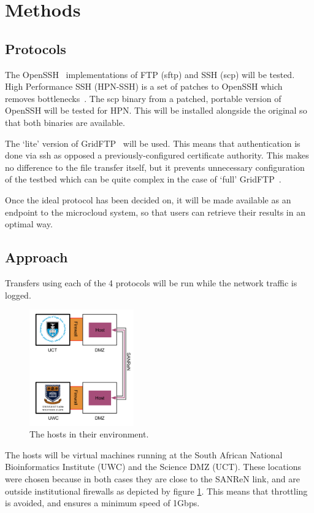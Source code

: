 \documentclass{sig-alternate-05-2015}
\begin{document}
\section{Methods}
\subsection{Protocols}
The OpenSSH~\cite{openssh} implementations of FTP (sftp) and SSH (scp) will be tested. High Performance SSH (HPN-SSH) is a set of patches to OpenSSH which removes bottlenecks~\cite{rapier2008high}. The scp binary from a patched, portable version of OpenSSH will be tested for HPN. This will be installed alongside the original so that both binaries are available.

The `lite' version of GridFTP~\cite{allcock2005globus} will be used. This means that authentication is done via ssh as opposed a previously-configured certificate authority. This makes no difference to the file transfer itself, but it prevents unnecessary configuration of the testbed which can be quite complex in the case of `full' GridFTP~\cite{gridftplite}.

Once the ideal protocol has been decided on, it will be made available as an endpoint to the microcloud system, so that users can retrieve their results in an optimal way.

\subsection{Approach}
Transfers using each of the 4 protocols will be run while the network traffic is logged.

\begin{figure}[H]
	\centering
	\includegraphics[width=0.4\textwidth]{img/route.png}
	\caption{The hosts in their environment.
	         \label{fig:route}}
\end{figure}

The hosts will be virtual machines running at the South African National Bioinformatics Institute (UWC) and the Science DMZ (UCT). These locations were chosen because in both cases they are close to the SANReN link, and are outside institutional firewalls as depicted by figure \ref{fig:route}. This means that throttling is avoided, and ensures a minimum speed of 1Gbps.
\end{document}
